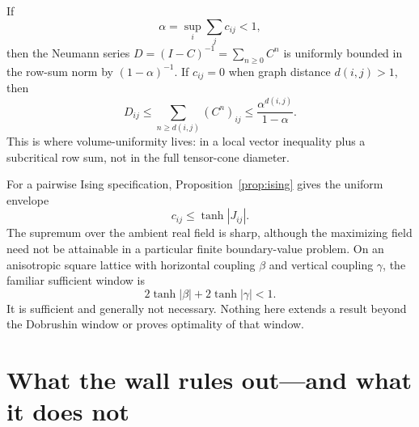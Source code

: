 \documentclass[11pt]{article}
\newcommand{\1}{\mathbf{1}}
\begin{document}
If
\begin{equation}\label{eq:alpha-window}
 \alpha=\sup_i\sum_jc_{ij}<1,
\end{equation}
then the Neumann series $D=(I-C)^{-1}=\sum_{n\geq0}C^n$ is uniformly bounded
in the row-sum norm by $(1-\alpha)^{-1}$.  If $c_{ij}=0$ when graph distance
$d(i,j)>1$, then
\begin{equation}\label{eq:spatial-resolvent}
 D_{ij}\leq\sum_{n\geq d(i,j)}(C^n)_{ij}
 \leq\frac{\alpha^{d(i,j)}}{1-\alpha}.
\end{equation}
This is where volume-uniformity lives: in a local vector inequality plus a
subcritical row sum, not in the full tensor-cone diameter.

For a pairwise Ising specification, Proposition~\ref{prop:ising} gives the
uniform envelope
\[
 c_{ij}\leq\tanh|J_{ij}|.
\]
The supremum over the ambient real field is sharp, although the maximizing
field need not be attainable in a particular finite boundary-value problem.
On an anisotropic square lattice with horizontal coupling $\beta$ and vertical
coupling $\gamma$, the familiar sufficient window is
\begin{equation}\label{eq:anisotropic-window}
 2\tanh|\beta|+2\tanh|\gamma|<1.
\end{equation}
It is sufficient and generally not necessary.  Nothing here extends a result
beyond the Dobrushin window or proves optimality of that window.

\section{What the wall rules out---and what it does not}
\end{document}
